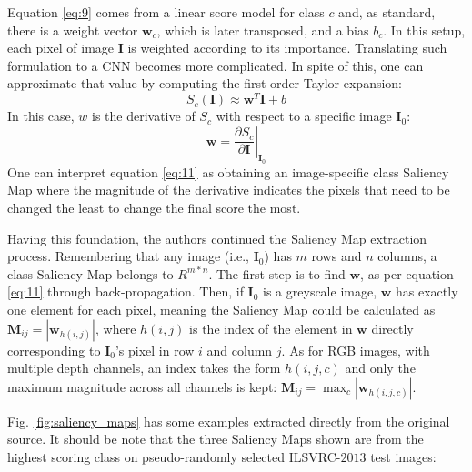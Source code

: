 Equation \ref{eq:9} comes from a linear score model for class $c$ and, as standard, there is a weight vector $\mathbf{w}_{c}$, which is later transposed, and a bias $b_{c}$. In this setup, each pixel of image $\mathbf{I}$ is weighted according to its importance. 
Translating such formulation to a \ac{CNN} becomes more complicated. In spite of this, one can approximate that value by computing the first-order Taylor expansion:
\begin{equation}
    S_{c}(\mathbf{I}) \approx \mathbf{w}^{T} \mathbf{I} + b
    \label{eq:10}
\end{equation}
In this case, $w$ is the derivative of $S_{c}$ with respect to a specific image $\mathbf{I}_{0}$:
\begin{equation}
    \left. \mathbf{w} = \frac{\partial S_{c}}{\partial \mathbf{I}} \right\rvert_ {\mathbf{I}_{0}}
    \label{eq:11}
\end{equation}
One can interpret equation \ref{eq:11} as obtaining an image-specific class Saliency Map where the magnitude of the derivative indicates the pixels that need to be changed the least to change the final score the most.

Having this foundation, the authors continued the Saliency Map extraction process. Remembering that any image (i.e., $\mathbf{I}_{0}$) has $m$ rows and $n$ columns, a class Saliency Map belongs to $R^{m*n}$. The first step is to find $\mathbf{w}$, as per equation \ref{eq:11} through back-propagation. Then, if $\mathbf{I}_{0}$ is a greyscale image, $\mathbf{w}$ has exactly one element for each pixel, meaning the Saliency Map could be calculated as $\mathbf{M}_{ij} = |\mathbf{w}_{h(i,j)}|$, where $h(i,j)$ is the index of the element in $\mathbf{w}$ directly corresponding to $\mathbf{I}_{0}$'s pixel in row $i$ and column $j$. As for \ac{RGB} images, with multiple depth channels, an index takes the form $h(i,j,c)$ and only the maximum magnitude across all channels is kept: $\mathbf{M}_{ij} = \max_{c}|\mathbf{w}_{h(i,j,c)}|$.

Fig. \ref{fig:saliency_maps} has some examples extracted directly from the original source. It should be note that the three Saliency Maps shown are from the highest scoring class on pseudo-randomly selected \ac{ILSVRC}-$2013$ test images:

